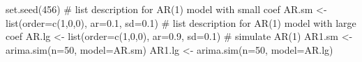 \begin{Schunk}
\begin{Sinput}
 set.seed(456)
 # list description for AR(1) model with small coef
 AR.sm <- list(order=c(1,0,0), ar=0.1, sd=0.1)
 # list description for AR(1) model with large coef
 AR.lg <- list(order=c(1,0,0), ar=0.9, sd=0.1)
 # simulate AR(1)
 AR1.sm <- arima.sim(n=50, model=AR.sm)
 AR1.lg <- arima.sim(n=50, model=AR.lg)
\end{Sinput}
\end{Schunk}
